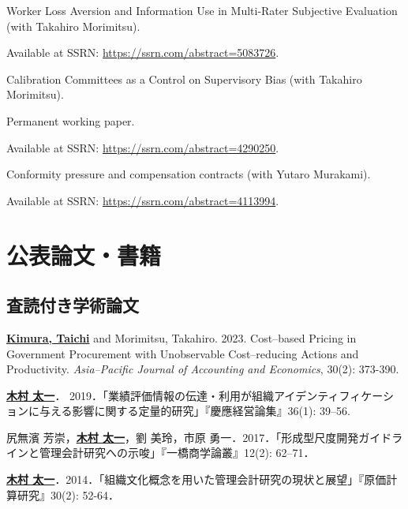 \documentclass[letterpaper,11pt]{article}
\renewenvironment{itemize}{
  \begin{list}{}{
    \setlength{\leftmargin}{1.5em}
  }
}{
  \end{list}
}
\begin{document}
\begin{itemize}
    \item  Worker Loss Aversion and Information Use in Multi-Rater Subjective Evaluation (with Takahiro Morimitsu).
        \begin{itemize}
            \item Available at SSRN: \url{https://ssrn.com/abstract=5083726}.
        \end{itemize}

    \item Calibration Committees as a Control on Supervisory Bias (with Takahiro Morimitsu).
        \begin{itemize}
            \item Permanent working paper.
            \item Available at SSRN: \url{https://ssrn.com/abstract=4290250}.
        \end{itemize}

    \item Conformity pressure and compensation contracts (with Yutaro Murakami).
        \begin{itemize}
            \item Available at SSRN: \url{https://ssrn.com/abstract=4113994}.
        \end{itemize}
\end{itemize}

\section*{公表論文・書籍}

\subsection*{査読付き学術論文}

\begin{itemize}
    \item \underline{\textbf{Kimura, Taichi}} and Morimitsu, Takahiro. 2023. Cost--based Pricing in Government Procurement with Unobservable Cost--reducing Actions and Productivity. \textit{Asia--Pacific Journal of Accounting and Economics}, 30(2): 373-390.

    \item \underline{\textbf{木村 太一}}． 2019．「業績評価情報の伝達・利用が組織アイデンティフィケーションに与える影響に関する定量的研究」『慶應経営論集』36(1): 39--56.

	\item 尻無濱 芳崇，\underline{\textbf{木村 太一}}，劉 美玲，市原 勇一．2017．「形成型尺度開発ガイドラインと管理会計研究への示唆」『一橋商学論叢』12(2): 62--71．

	\item \underline{\textbf{木村 太一}}．2014．「組織文化概念を用いた管理会計研究の現状と展望」『原価計算研究』30(2): 52-64．
\end{itemize}
\end{document}
